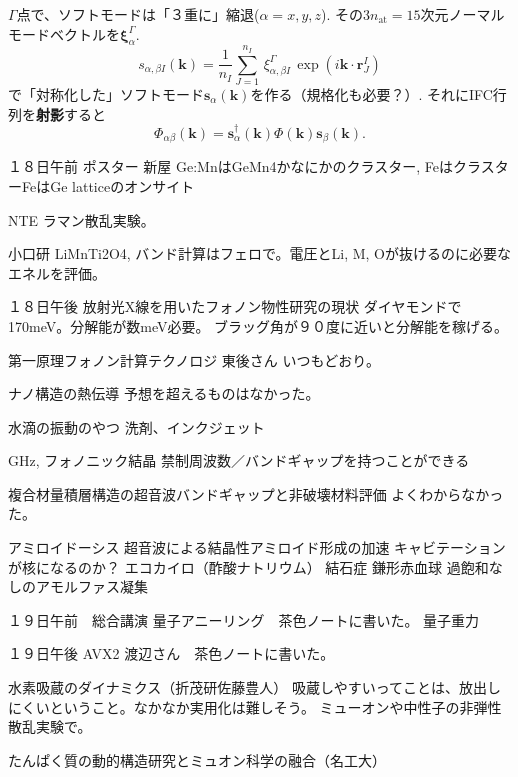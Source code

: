 \documentclass[a4paper,12pt]{jarticle}
\newcommand{\ab}{{\alpha\beta}}
\begin{document}
\pagestyle{empty}
\thispagestyle{empty}


\vspace*{15cm}

\noindent$\Gamma$点で、ソフトモードは「３重に」縮退($\alpha=x,y,z$).
その$3n_\mathrm{at}=15$次元ノーマルモードベクトルを$\bm{\xi}^\Gamma_\alpha$.
\begin{equation}
  \label{eq:symmetrize}
  s_{\alpha, \beta I} (\bm{k})=
  \frac{1}{n_I}\sum_{J=1}^{n_I}\,\xi^\Gamma_{\alpha, \beta I}\,\exp( i \bm{k}\cdot \bm{r}^I_J)
\end{equation}
で「対称化した」ソフトモード$\bm{s}_\alpha(\bm{k})$を作る（規格化も必要？）.
それにIFC行列を{\bf 射影}すると
\begin{equation}
  \label{eq:projection}
  \Phi_\ab (\bm{k}) = \bm{s}_\alpha^\dagger(\bm{k}) \Phi(\bm{k}) \bm{s}_\beta (\bm{k}).
\end{equation}


１８日午前
ポスター
新屋 Ge:MnはGeMn4かなにかのクラスター, FeはクラスターFeはGe latticeのオンサイト

NTE ラマン散乱実験。

小口研 LiMnTi2O4, バンド計算はフェロで。電圧とLi, M, Oが抜けるのに必要なエネルを評価。

１８日午後
放射光X線を用いたフォノン物性研究の現状
ダイヤモンドで170meV。分解能が数meV必要。
ブラッグ角が９０度に近いと分解能を稼げる。

第一原理フォノン計算テクノロジ 東後さん
いつもどおり。

ナノ構造の熱伝導
予想を超えるものはなかった。

水滴の振動のやつ
洗剤、インクジェット

GHz, フォノニック結晶
禁制周波数／バンドギャップを持つことができる

複合材量積層構造の超音波バンドギャップと非破壊材料評価
よくわからなかった。

アミロイドーシス
超音波による結晶性アミロイド形成の加速
キャビテーションが核になるのか？
エコカイロ（酢酸ナトリウム）
結石症
鎌形赤血球
過飽和なしのアモルファス凝集

１９日午前　総合講演
量子アニーリング　茶色ノートに書いた。
量子重力

１９日午後
AVX2 渡辺さん　茶色ノートに書いた。

水素吸蔵のダイナミクス（折茂研佐藤豊人）
吸蔵しやすいってことは、放出しにくいということ。なかなか実用化は難しそう。
ミューオンや中性子の非弾性散乱実験で。

たんぱく質の動的構造研究とミュオン科学の融合（名工大）
\end{document}
